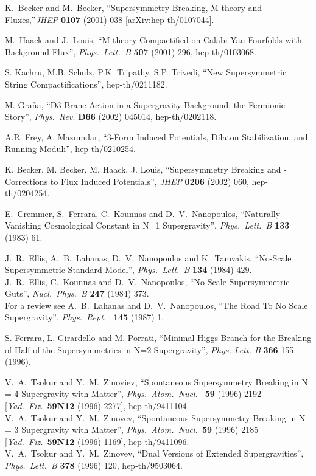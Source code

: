 \documentclass[a4paper,12pt]{article}
\begin{document}
\begin{thebibliography}{99}
 K.~Becker and M.~Becker,
``Supersymmetry Breaking, M-theory and Fluxes,''{\it  JHEP} {\bf 0107} (2001) 038
[arXiv:hep-th/0107044].

 M.~Haack and J.~Louis,
``M-theory Compactified on Calabi-Yau Fourfolds with Background Flux'',
{\it Phys.\ Lett.\ B} {\bf 507} (2001) 296, hep-th/0103068. 


S. Kachru, M.B. Schulz, P.K. Tripathy, S.P. Trivedi, 
``New Supersymmetric String Compactifications'', hep-th/0211182.

M. Gra\~na, ``D3-Brane Action in a Supergravity Background: the Fermionic Story'', {\it Phys.\ Rev.} {\bf D66} (2002) 045014, 
hep-th/0202118.



A.R. Frey, A. Mazumdar, 
``3-Form Induced Potentials, Dilaton Stabilization, and Running Moduli'', 
hep-th/0210254.

K. Becker, M. Becker, M. Haack, J. Louis, ``Supersymmetry Breaking and \coordHE{}-Corrections to Flux Induced Potentials'',
{\it  JHEP} {\bf 0206} (2002) 060, hep-th/0204254.

 E.~Cremmer, S.~Ferrara, C.~Kounnas and D.~V.~Nanopoulos,
``Naturally Vanishing Cosmological Constant in N=1 Supergravity'', {\it Phys.\ Lett.\ B} {\bf 133} (1983) 61.


 J.~R.~Ellis, A.~B.~Lahanas, D.~V.~Nanopoulos and K.~Tamvakis,
``No-Scale Supersymmetric Standard Model'', {\it Phys.\ Lett.\ B} {\bf 134} (1984) 429. \\
J.~R.~Ellis, C.~Kounnas and D.~V.~Nanopoulos, ``No-Scale
Supersymmetric Guts'', {\it  Nucl.\ Phys.\ B} {\bf 247} (1984) 373.\\
For a review  see A.~B.~Lahanas and D.~V.~Nanopoulos, ``The Road
To No Scale Supergravity'',
{\it Phys.\ Rept.\ } {\bf 145} (1987) 1.



S. Ferrara, L. Girardello and M. Porrati, ``Minimal Higgs Branch
for the Breaking of Half of the Supersymmetries in N=2
Supergravity'', {\it Phys. Lett. B} {\bf 366}  155 (1996).





 V.~A.~Tsokur and Y.~M.~Zinoviev,
``Spontaneous Supersymmetry Breaking in N = 4 Supergravity with Matter'',
{\it Phys.\ Atom.\ Nucl.\ } {\bf 59} (1996) 2192 [{\it Yad.\ Fiz.}\ {\bf 59N12} (1996) 2277], hep-th/9411104.\\
V.~A.~Tsokur and Y.~M.~Zinovev, ``Spontaneous Supersymmetry
Breaking in N = 3 Supergravity with Matter'', {\it Phys.\ Atom.\
Nucl.}\  {\bf 59} (1996) 2185 [{\it Yad.\ Fiz.}\  {\bf 59N12} (1996)
1169], hep-th/9411096.\\
V.~A.~Tsokur and Y.~M.~Zinovev,
``Dual Versions of Extended Supergravities'', {\it Phys.\ Lett.\ B} {\bf 378} (1996) 120, hep-th/9503064.


\end{thebibliography}
\end{document}
